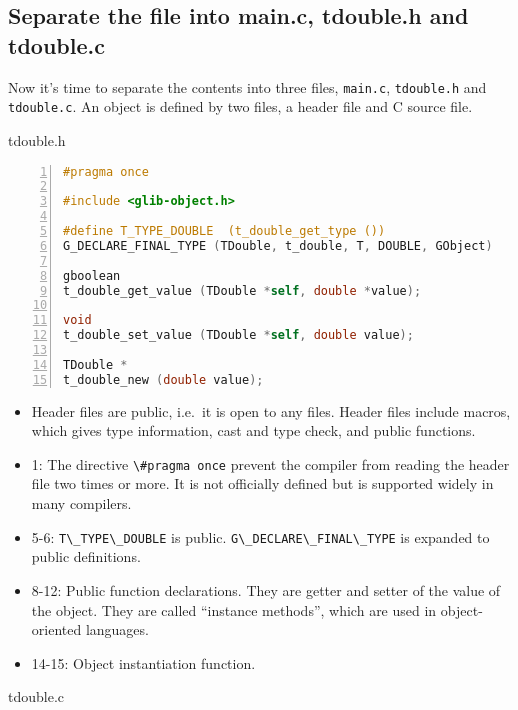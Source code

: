 \subsection{Separate the file into main.c, tdouble.h and
tdouble.c}\label{separate-the-file-into-main.c-tdouble.h-and-tdouble.c}

Now it's time to separate the contents into three files,
\passthrough{\lstinline!main.c!}, \passthrough{\lstinline!tdouble.h!}
and \passthrough{\lstinline!tdouble.c!}. An object is defined by two
files, a header file and C source file.

tdouble.h

\begin{lstlisting}[language=C, numbers=left]
#pragma once

#include <glib-object.h>

#define T_TYPE_DOUBLE  (t_double_get_type ())
G_DECLARE_FINAL_TYPE (TDouble, t_double, T, DOUBLE, GObject)

gboolean
t_double_get_value (TDouble *self, double *value);

void
t_double_set_value (TDouble *self, double value);

TDouble *
t_double_new (double value);
\end{lstlisting}

\begin{itemize}
\tightlist
\item
  Header files are public, i.e.~it is open to any files. Header files
  include macros, which gives type information, cast and type check, and
  public functions.
\item
  1: The directive \passthrough{\lstinline!\#pragma once!} prevent the
  compiler from reading the header file two times or more. It is not
  officially defined but is supported widely in many compilers.
\item
  5-6: \passthrough{\lstinline!T\_TYPE\_DOUBLE!} is public.
  \passthrough{\lstinline!G\_DECLARE\_FINAL\_TYPE!} is expanded to
  public definitions.
\item
  8-12: Public function declarations. They are getter and setter of the
  value of the object. They are called ``instance methods'', which are
  used in object-oriented languages.
\item
  14-15: Object instantiation function.
\end{itemize}

tdouble.c

